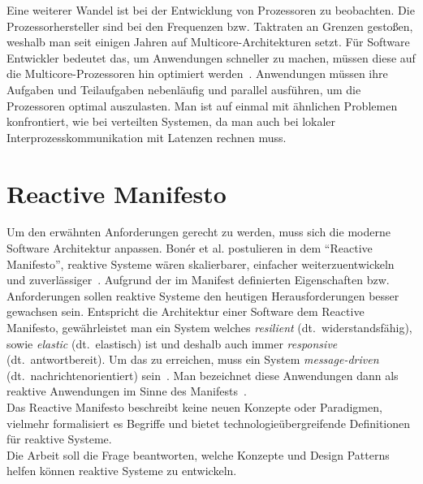 Eine weiterer Wandel ist bei der Entwicklung von Prozessoren zu beobachten. Die Prozessorhersteller sind bei den Frequenzen bzw. Taktraten an Grenzen gestoßen, weshalb man seit einigen Jahren auf Multicore-Architekturen setzt. Für Software Entwickler bedeutet das, um Anwendungen schneller zu machen, müssen diese auf die Multicore-Prozessoren hin optimiert werden~\cite[S. 15]{butcher_seven_2014}. Anwendungen müssen ihre Aufgaben und Teilaufgaben nebenläufig und parallel ausführen, um die Prozessoren optimal auszulasten. Man ist auf einmal mit ähnlichen Problemen konfrontiert, wie bei verteilten Systemen, da man auch bei lokaler Interprozesskommunikation mit Latenzen rechnen muss.

\pagebreak

\section{Reactive Manifesto}
Um den erwähnten Anforderungen gerecht zu werden, muss sich die moderne Software Architektur anpassen. Bonér et al. postulieren in dem \enquote{Reactive Manifesto}, reaktive Systeme wären skalierbarer, einfacher weiterzuentwickeln und zuverlässiger~\cite{boner_reactive_2014}. Aufgrund der im Manifest definierten Eigenschaften bzw. Anforderungen sollen reaktive Systeme den heutigen Herausforderungen besser gewachsen sein. Entspricht die Architektur einer Software dem Reactive Manifesto, gewährleistet man ein System welches \textit{resilient} (dt.~widerstandsfähig), sowie \textit{elastic} (dt.~elastisch) ist und deshalb auch immer \textit{responsive} (dt.~antwortbereit). Um das zu erreichen, muss ein System \textit{message-driven} (dt.~nachrichtenorientiert) sein~\cite[S.~5]{vernon_reactive_2016}. Man bezeichnet diese Anwendungen dann als reaktive Anwendungen im Sinne des Manifests~\cite{boner_reactive_2014}.\\
Das Reactive Manifesto beschreibt keine neuen Konzepte oder Paradigmen, vielmehr formalisiert es Begriffe und bietet technologieübergreifende Definitionen für reaktive Systeme.\\

Die Arbeit soll die Frage beantworten, welche Konzepte und Design Patterns helfen können reaktive Systeme zu entwickeln.
